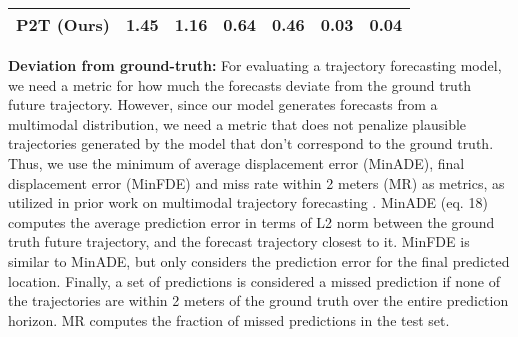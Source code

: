 \documentclass[journal]{IEEEtran}
\begin{document}
\begin{table*}[]
\begin{tabularx}{0.85\textwidth}{lYYYYYY}
P2T (Ours)                       & \textbf{1.45}        & \textbf{1.16}         & 0.64         & \textbf{0.46}      & \textbf{0.03}                                                                     & \textbf{0.04}                                                                      \\ \bottomrule
\end{tabularx}
\label{tab:ns}
\end{table*}


\noindent\textbf{Deviation from ground-truth:} For evaluating a trajectory forecasting model, we need a metric for how much the forecasts deviate from the ground truth future trajectory. However, since our model generates forecasts from a multimodal distribution, we need a metric that does not penalize plausible trajectories generated by the model that don't correspond to the ground truth. Thus, we use the minimum of  average displacement error (MinADE), final displacement error (MinFDE) and miss rate within 2 meters (MR) as metrics, as utilized in prior work on multimodal trajectory forecasting \cite{gupta2018social, sadeghian2018sophie, lee2017desire, rhinehart2019precog, zhao2019multi, bhattacharyya2019conditional, chang2019argoverse}. MinADE (eq. 18) computes the average prediction error in terms of L2 norm between the ground truth future trajectory, and the forecast trajectory closest to it. MinFDE is similar to MinADE, but only considers the  prediction error  for  the  final  predicted  location. Finally, a set of  predictions is considered a missed prediction if none of the  trajectories are within 2 meters of the ground truth over the entire prediction horizon. MR computes the fraction of missed predictions in the test set. 
\end{document}
